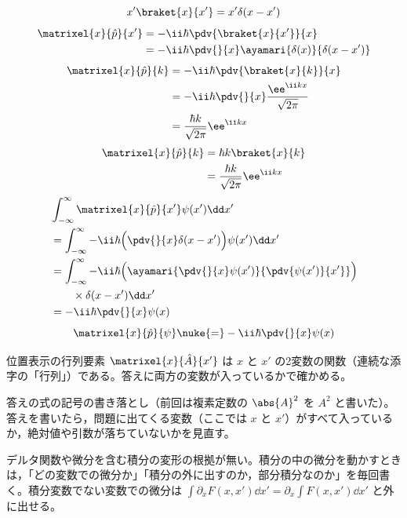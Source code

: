 \[ x'\braket{x}{x'}=x'\delta(x-x') \]
\begin{align*}
\matrixel{x}{\hat{p}}{x'}&=-\ii\hbar\pdv{\braket{x}{x'}}{x}\\
&=-\ii\hbar\pdv{}{x}\ayamari{\delta(x)}{\delta(x-x')}
\end{align*}
\begin{align*}
\matrixel{x}{\hat{p}}{k}&=-\ii\hbar\pdv{\braket{x}{k}}{x}\\
&=-\ii\hbar\pdv{}{x}\frac{\ee^{\ii kx}}{\sqrt{2\pi}}\\
&=\frac{\hbar k}{\sqrt{2\pi}}\ee^{\ii kx}
\end{align*}
\begin{align*}
\matrixel{x}{\hat{p}}{k}&=\hbar k\braket{x}{k}\\
&=\frac{\hbar k}{\sqrt{2\pi}}\ee^{\ii kx}
\end{align*}
\begin{align*}
&\int_{-\infty}^{\infty}\matrixel{x}{\hat{p}}{x'}\psi(x')\dd x'\\
&=\int_{-\infty}^{\infty}-\ii\hbar\Bigl(\pdv{}{x}\delta(x-x')\Bigr)\psi(x')\dd x'\\
&=\int_{-\infty}^{\infty}-\ii\hbar\Bigl(\ayamari{\pdv{}{x}\psi(x')}{\pdv{\psi(x')}{x'}}\Bigr)\\
&\qquad\times\delta(x-x')\dd x'\\
&=-\ii\hbar\pdv{}{x}\psi(x)
\end{align*}
\[ \matrixel{x}{\hat{p}}{\psi}\nuke{=}-\ii\hbar\pdv{}{x}\psi(x) \]
\item 位置表示の行列要素 $\matrixel{x}{\hat{A}}{x'}$ は $x$ と $x'$ の2変数の関数（連続な添字の「行列」）である。答えに両方の変数が入っているかで確かめる。
\item {} 答えの式の記号の書き落とし（前回は複素定数の $\abs{A}^{2}$ を $A^{2}$ と書いた）。答えを書いたら，問題に出てくる変数（ここでは $x$ と $x'$）がすべて入っているか，絶対値や引数が落ちていないかを見直す。
\item {} デルタ関数や微分を含む積分の変形の根拠が無い。積分の中の微分を動かすときは，「どの変数での微分か」「積分の外に出すのか，部分積分なのか」を毎回書く。積分変数でない変数での微分は $\int\partial_{x}F(x,x')\dd x'=\partial_{x}\int F(x,x')\dd x'$ と外に出せる。
